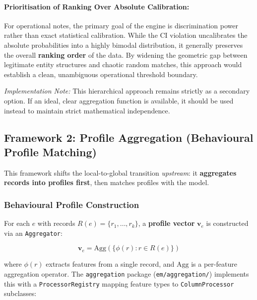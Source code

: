 \paragraph{Prioritisation of Ranking Over Absolute Calibration:} For operational notes, the primary goal of the engine is discrimination power rather than exact statistical calibration. While the CI violation uncalibrates the absolute probabilities into a highly bimodal distribution, it generally preserves the overall \textbf{ranking order} of the data. By widening the geometric gap between legitimate entity structures and chaotic random matches, this approach would establish a clean, unambiguous operational threshold boundary.

\textit{Implementation Note:} This hierarchical approach remains strictly as a secondary option. If an ideal, clear aggregation function is available, it should be used instead to maintain strict mathematical independence.


\subsection{Framework 2: Profile Aggregation (Behavioural Profile Matching)}
\label{sec:profile_aggregation}

This framework shifts the local-to-global transition \textit{upstream}: it \textbf{aggregates records into profiles first}, then matches profiles with the \fellegisunter{} model.

\subsubsection{Behavioural Profile Construction}
\label{sec:profile_construction}

For each \globalentity{} $e$ with records $R(e) = \{r_1, \dots, r_k\}$, a \textbf{profile vector} $\mathbf{v}_e$ is constructed via an \texttt{Aggregator}:

\begin{equation}
	\mathbf{v}_e = \text{Agg}\left( \{ \phi(r) : r \in R(e) \} \right)
\end{equation}

where $\phi(r)$ extracts features from a single record, and $\text{Agg}$ is a per-feature aggregation operator. The \texttt{aggregation} package (\texttt{em/aggregation/}) implements this with a \texttt{ProcessorRegistry} mapping feature types to \texttt{ColumnProcessor} subclasses:

